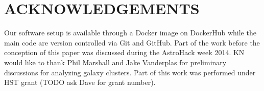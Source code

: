 \section{ACKNOWLEDGEMENTS}
Our software setup is available through a Docker image on DockerHub while the
main code are version controlled via Git and GitHub. 
Part of the work before the conception of this paper was discussed during 
the AstroHack week 2014. KN would like to thank Phil
Marshall and Jake Vanderplas for preliminary discussions for analyzing galaxy clusters. 
Part of this work was performed under HST grant (TODO ask Dave for grant
number). 







